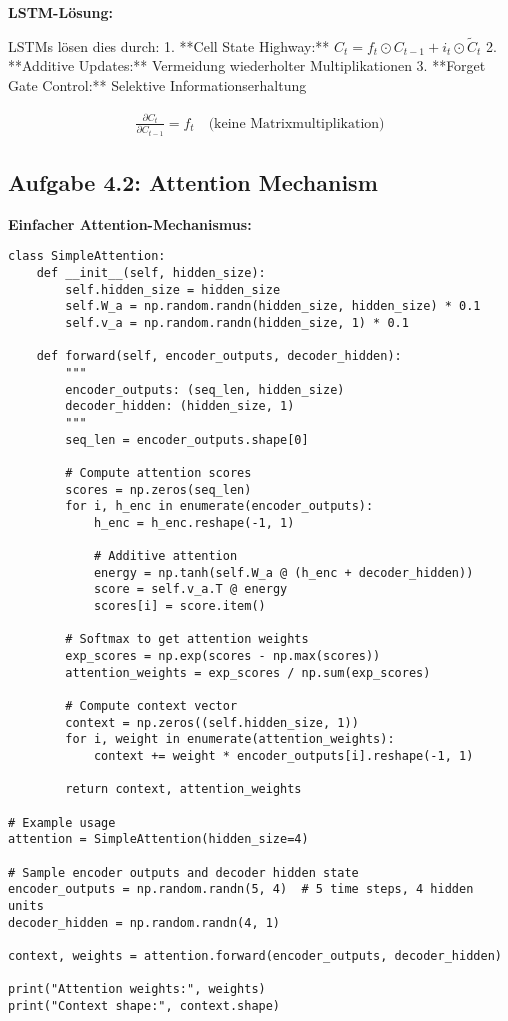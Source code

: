 ﻿\documentclass[12pt,a4paper]{article}
\begin{document}
\textbf{LSTM-Lösung:}

LSTMs lösen dies durch:
1. **Cell State Highway:** $C_t = f_t \odot C_{t-1} + i_t \odot \tilde{C}_t$
2. **Additive Updates:** Vermeidung wiederholter Multiplikationen
3. **Forget Gate Control:** Selektive Informationserhaltung

\begin{align}
\frac{\partial C_t}{\partial C_{t-1}} = f_t \quad \text{(keine Matrixmultiplikation)}
\end{align}

\subsection{Aufgabe 4.2: Attention Mechanism}

\textbf{Einfacher Attention-Mechanismus:}

\begin{lstlisting}
class SimpleAttention:
    def __init__(self, hidden_size):
        self.hidden_size = hidden_size
        self.W_a = np.random.randn(hidden_size, hidden_size) * 0.1
        self.v_a = np.random.randn(hidden_size, 1) * 0.1
    
    def forward(self, encoder_outputs, decoder_hidden):
        """
        encoder_outputs: (seq_len, hidden_size)
        decoder_hidden: (hidden_size, 1)
        """
        seq_len = encoder_outputs.shape[0]
        
        # Compute attention scores
        scores = np.zeros(seq_len)
        for i, h_enc in enumerate(encoder_outputs):
            h_enc = h_enc.reshape(-1, 1)
            
            # Additive attention
            energy = np.tanh(self.W_a @ (h_enc + decoder_hidden))
            score = self.v_a.T @ energy
            scores[i] = score.item()
        
        # Softmax to get attention weights
        exp_scores = np.exp(scores - np.max(scores))
        attention_weights = exp_scores / np.sum(exp_scores)
        
        # Compute context vector
        context = np.zeros((self.hidden_size, 1))
        for i, weight in enumerate(attention_weights):
            context += weight * encoder_outputs[i].reshape(-1, 1)
        
        return context, attention_weights

# Example usage
attention = SimpleAttention(hidden_size=4)

# Sample encoder outputs and decoder hidden state
encoder_outputs = np.random.randn(5, 4)  # 5 time steps, 4 hidden units
decoder_hidden = np.random.randn(4, 1)

context, weights = attention.forward(encoder_outputs, decoder_hidden)

print("Attention weights:", weights)
print("Context shape:", context.shape)
\end{lstlisting}
\end{document}
